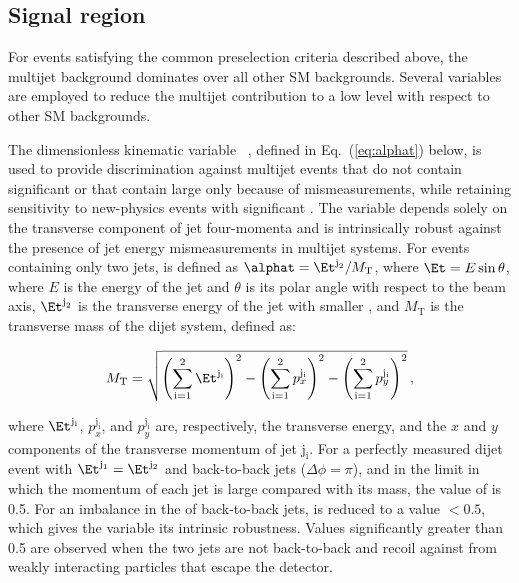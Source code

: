 \subsection{Signal region}
\label{sec:signal_region} 

For events satisfying the common preselection criteria described
above, the multijet background dominates over all other SM
backgrounds. Several variables are employed to reduce the multijet
contribution to a low level with respect to other SM backgrounds.

The dimensionless kinematic variable \alphat~\cite{Randall:2008rw,
  RA1Paper}, defined in Eq.~(\ref{eq:alphat}) below, is used to
provide discrimination against multijet events that do not contain
significant \ptvecmiss or that contain large \ptvecmiss only because
of \Pt mismeasurements, while retaining sensitivity to new-physics
events with significant \ptvecmiss. The \alphat variable depends
solely on the transverse component of jet four-momenta
and is intrinsically robust against the presence of jet energy
mismeasurements in multijet systems. For events containing only two
jets, \alphat is defined as $\alphat = \Et^{\text j_2}/M_\text{T}$,
where $\Et = E\sin\theta$, 
where $E$ is the energy of the jet and $\theta$ is its polar angle
with respect to the beam axis, $\Et^{\text j_2}$ is the transverse
energy of the jet with smaller \Et, and $M_\text{T}$ is the transverse
mass of the dijet system, defined as:

\begin{equation}
  \label{eq:mt}
  M_\text{T} = \sqrt{ \left( \sum_{\textrm{i}=1}^2 \Et^{\mathrm{j_i}}
    \right)^2 - \left( \sum_{\textrm{i}=1}^2 p_x^{\mathrm{j_i}} \right)^2 - \left(
      \sum_{\textrm{i}=1}^2 p_y^{\mathrm{j_i}} \right)^2}\, ,
\end{equation}

where $\Et^{\mathrm{j_i}}$, $p_x^{\mathrm{j_i}}$, and
$p_y^{\mathrm{j_i}}$ are, respectively, the transverse energy, and the
$x$ and $y$ components of the transverse momentum of jet
$\mathrm{j_i}$.
For a perfectly measured dijet event with $\Et^{\mathrm{j_1}} =
\Et^{\mathrm{j_2}}$ and back-to-back jets ($\Delta\phi = \pi$), and in
the limit in which the momentum of each jet is large compared with its
mass, the value of \alphat is 0.5. For an imbalance in the \Et of
back-to-back jets, \alphat is reduced to a value $<0.5$, which gives
the variable its intrinsic robustness. Values significantly greater
than 0.5 are observed when the two jets are not back-to-back and
recoil against \ptvecmiss from weakly interacting particles that
escape the detector.

